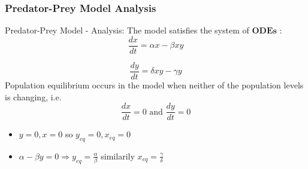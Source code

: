 







\begin{frame}
    \frametitle{Predator-Prey Model Analysis}
Predator-Prey Model - Analysis: The model satisfies the
system of $ \boldsymbol { O D E s } $ :  
\begin{equation*}
     \frac { d x } { d t } = \alpha x - \beta x y
\end{equation*}

\begin{equation*}
     \frac { d y } { d t } = \delta x y - \gamma y
\end{equation*}
Population equilibrium occurs in the model when neither of the population levels is changing,
i.e. \\
\begin{equation*}
    \frac { d x } { d t } = 0  \text{ and } \frac { d y } { d t } = 0
\end{equation*}
\begin{itemize}
    \item $ y = 0 , x = 0 $ so $ y _ { e q } = 0 , x _ { e q } = 0 $
    \item $ \alpha - \beta y = 0 \Longrightarrow y _ { e q } = \frac { \alpha } { \beta } $ similarily $ x _ { e q } = \frac { \gamma } { \delta } $
\end{itemize}
\end{frame}

